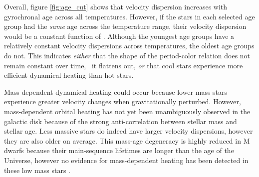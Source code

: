 Overall, figure \ref{fig:age_cut} shows that velocity dispersion increases
with gyrochronal age across all temperatures.
However, if the stars in each selected age group had the {\it same} age across
the temperature range, their velocity dispersion would be a constant function
of \teff.
Although the youngest age groups have a relatively constant velocity
dispersions across temperatures, the oldest age groups do not.
This indicates {\it either} that the shape of the period-color relation does
not remain constant over time, \ie\ it flattens out, {\it or} that cool stars
experience more efficient dynamical heating than hot stars.

Mass-dependent dynamical heating could occur because lower-mass stars
experience greater velocity changes when gravitationally perturbed.
However, mass-dependent orbital heating has not yet been unambiguously
observed in the galactic disk because of the strong anti-correlation between
stellar mass and stellar age.
Less massive stars do indeed have larger velocity dispersions, however they
are also older on average.
This mass-age degeneracy is highly reduced in M dwarfs because their
main-sequence lifetimes are longer than the age of the Universe, however no
evidence for mass-dependent heating has been detected in these low mass stars
\citep{faherty2009}.

